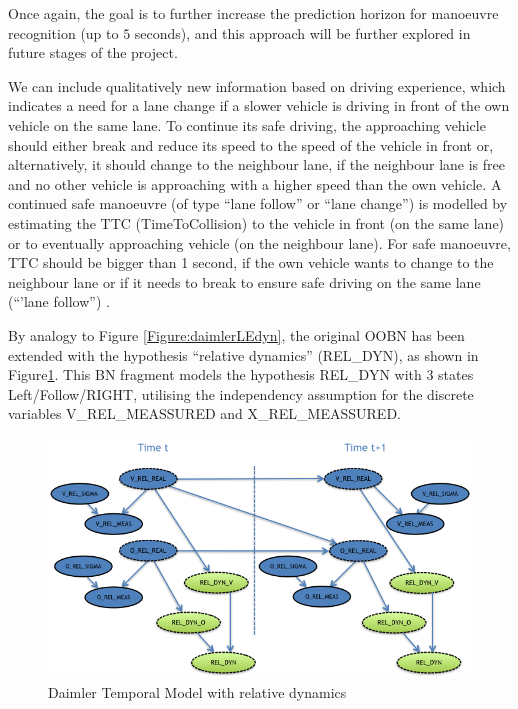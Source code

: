  Once again, the goal is to further increase the prediction horizon for manoeuvre recognition (up to $5$ seconds), and this approach will be further explored in future stages of the project. 


We can include qualitatively new information based on driving experience, which indicates a need for a lane change if a slower vehicle is driving in front of the own vehicle on the same lane. To continue its safe driving, the approaching vehicle should either break and reduce its speed to the speed of the vehicle in front or, alternatively, it should change to the neighbour lane, if the neighbour lane is free and no other vehicle is approaching with a higher speed than the own vehicle. A continued safe manoeuvre (of type ``lane follow'' or ``lane change'') is modelled by estimating the TTC (TimeToCollision) to the vehicle in front (on the same lane) or to eventually approaching vehicle (on the neighbour lane). For safe manoeuvre, TTC should be bigger than 1 second, if the own vehicle wants to change to the neighbour lane or if it needs to break to ensure safe driving on the same lane (``'lane follow'') .


By analogy to Figure \ref{Figure:daimlerLEdyn}, the original OOBN has been extended with the hypothesis ``relative dynamics'' (REL\_DYN), as shown in Figure\ref{Figure:daimlerreldyn}. This BN fragment  models the hypothesis REL\_DYN with 3 states Left/Follow/RIGHT, utilising the independency assumption for the discrete variables V\_REL\_MEASSURED and X\_REL\_MEASSURED.

\begin{figure}
\begin{center}
\includegraphics[scale=0.58]{./figures/Daimlerreldyn.png}
\end{center}
\caption{\label{Figure:daimlerreldyn}Daimler Temporal Model with relative dynamics}
\end{figure}

